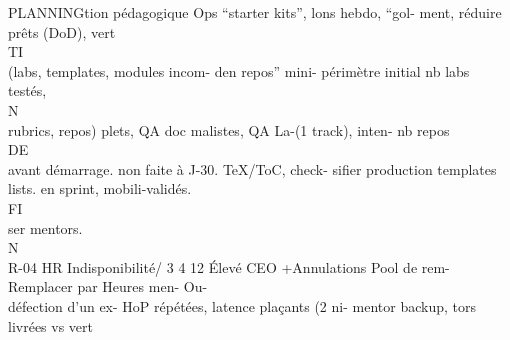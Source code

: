 PLANNINGtion pédagogique               Ops      “starter     kits”, lons hebdo, “gol- ment,     réduire prêts (DoD), vert\\
\vspace{0.5em}
\vspace{0.5em}
\vspace{0.5em}
\vspace{0.5em}
TI\\
(labs, templates,                       modules incom- den repos” mini- périmètre initial nb labs testés,\\
\vspace{0.5em}
\vspace{0.5em}
\vspace{0.5em}
\vspace{0.5em}
N\\
rubrics,   repos)                       plets, QA doc malistes, QA La-(1 track), inten- nb               repos\\
\vspace{0.5em}
\vspace{0.5em}
\vspace{0.5em}
\vspace{0.5em}
DE\\
avant démarrage.                        non faite à J-30. TeX/ToC, check- sifier production templates\\
lists.            en sprint, mobili-validés.\\
\vspace{0.5em}
\vspace{0.5em}
\vspace{0.5em}
\vspace{0.5em}
FI\\
ser mentors.\\
\vspace{0.5em}
\vspace{0.5em}
\vspace{0.5em}
\vspace{0.5em}
N\\
R-04   HR       Indisponibilité/ 3 4 12 Élevé CEO     +Annulations       Pool de rem- Remplacer par Heures men- Ou-\\
défection d’un ex-            HoP      répétées, latence plaçants (2 ni- mentor backup, tors livrées vs vert\\
\vspace{0.5em}
\vspace{0.5em}
\vspace{0.5em}
\vspace{0.5em}
